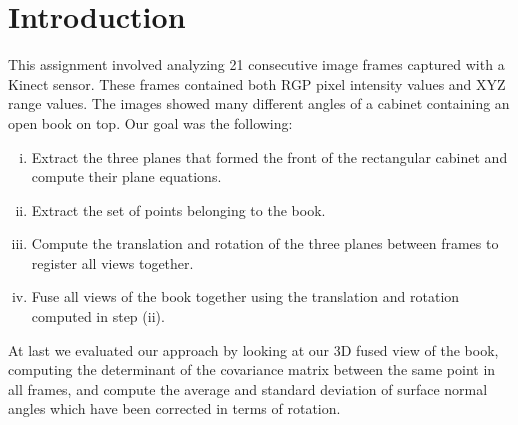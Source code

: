 \section{Introduction}
This assignment involved analyzing 21 consecutive image frames captured with a Kinect sensor. These frames contained both RGP pixel intensity values and XYZ range values. The images showed many different angles of a cabinet containing an open book on top. Our goal was the following:
\begin{enumerate}[(i)]
	\item Extract the three planes that formed the front of the rectangular cabinet and compute their plane equations.
	\item Extract the set of points belonging to the book.
	\item Compute the translation and rotation of the three planes between frames to register all views together.
	\item Fuse all views of the book together using the translation and rotation computed in step (ii).
\end{enumerate}
At last we evaluated our approach by looking at our 3D fused view of the book, computing the determinant of the covariance matrix between the same point in all frames, and compute the average and standard deviation of surface normal angles which have been corrected in terms of rotation.